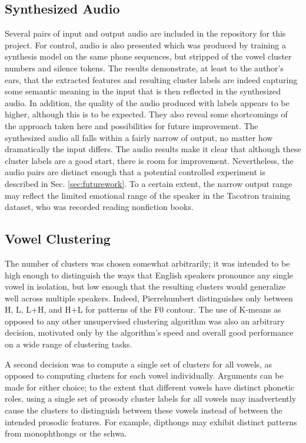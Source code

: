 \documentclass{article}
\begin{document}
\subsection{Synthesized Audio}
\label{ssec:audio}

Several pairs of input and output audio are included in the repository for this project. For control, audio is also presented which was produced by training a synthesis model on the same phone sequences, but stripped of the vowel cluster numbers and silence tokens.
The results demonstrate, at least to the author's ears, that the extracted features and resulting cluster labels are indeed capturing some semantic meaning in the input that is then reflected in the synthesized audio. In addition, the quality of the audio produced with labels appears to be higher, although this is to be expected.
They also reveal some shortcomings of the approach taken here and possibilities for future improvement.
The synthesized audio all falls within a fairly narrow of output, no matter how dramatically the input differs.
The audio results make it clear that although these cluster labels are a good start, there is room for improvement.
Nevertheless, the audio pairs are distinct enough that a potential controlled experiment is described in Sec. \ref{sec:futurework}. To a certain extent, the narrow output range may reflect the limited emotional range of the speaker in the Tacotron training dataset, who was recorded reading nonfiction books.

\subsection{Vowel Clustering}
\label{ssec:discussvowels}

The number of clusters was chosen somewhat arbitrarily; it was intended to be high enough to distinguish the ways that English speakers pronounce any single vowel in isolation, but low enough that the resulting clusters would generalize well across multiple speakers. Indeed, Pierrehumbert \cite{pierrehumbert1980phonology} distinguishes only between H, L, L+H, and H+L for patterns of the F0 contour.
The use of K-means as opposed to any other unsupervised clustering algorithm was also an arbitrary decision, motivated only by the algorithm's speed and overall good performance on a wide range of clustering tasks.

A second decision was to compute a single set of clusters for all vowels, as opposed to computing clusters for each vowel individually.
Arguments can be made for either choice; to the extent that different vowels have distinct phonetic roles, using a single set of prosody cluster labels for all vowels may inadvertently cause the clusters to distinguish between these vowels instead of between the intended prosodic features. For example, dipthongs may exhibit distinct patterns from monophthongs or the schwa.
\end{document}
